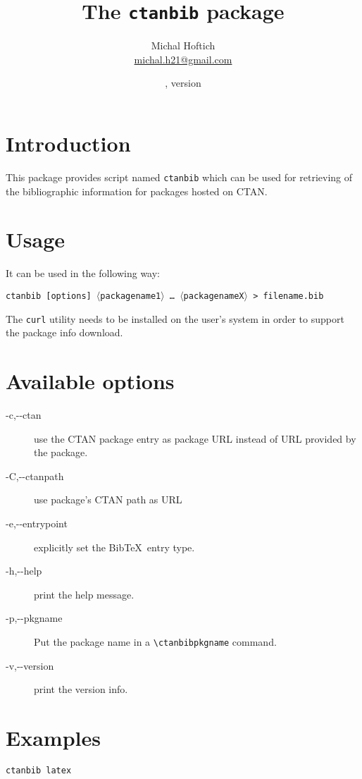 \documentclass[11pt]{ltxdoc}
\title{The \texttt{ctanbib} package}
\author{Michal Hoftich\\\href{mailto:michal.h21@gmail.com}{michal.h21@gmail.com}}
\date{\gitdate, version \gitversion}
\newcommand\package[1]{\texttt{#1}}
\begin{document}
\maketitle

\section{Introduction}
This package provides script named \package{ctanbib} which can be used for retrieving of the bibliographic information for packages hosted on CTAN.


\section{Usage}


It can be used in the following way:


\medskip

\noindent\package{ctanbib [options]  $\langle$packagename1$\rangle$ \ldots\ $\langle$packagenameX$\rangle$ > filename.bib}

\medskip

The \texttt{curl} utility needs to be installed on the user's system in order to support the package info download.


\section{Available options}

\begin{description}
  \item[-c,-\/-ctan] use the CTAN package entry as package URL instead of URL provided by the package.
  \item[-C,-\/-ctanpath]   use package's CTAN path as URL
  \item[-e,-\/-entrypoint] explicitly set the Bib\TeX\ entry type.
  \item[-h,-\/-help] print the help message.
  \item[-p,-\/-pkgname] Put the package name in a \verb|\ctanbibpkgname| command.
  \item[-v,-\/-version] print the version info.
\end{description}


\section{Examples}

\begin{verbatim}
ctanbib latex  
\end{verbatim}
\end{document}
